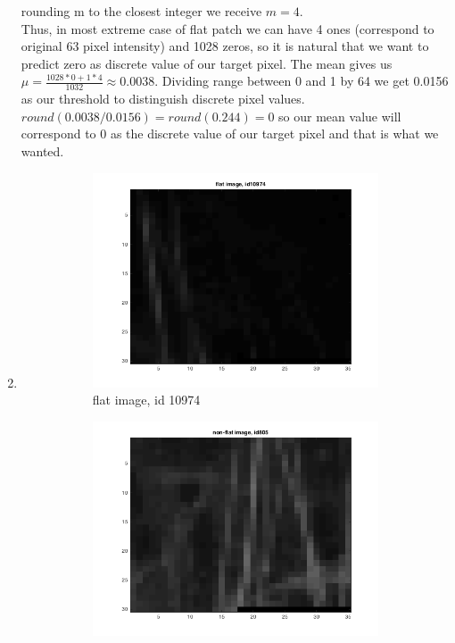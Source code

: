 \documentclass{article}
\begin{document}
\begin{enumerate}[label=(\alph*)]
					rounding m to the closest integer we receive $m = 4$. \\Thus, in most extreme case of flat patch we can have 4 ones (correspond to original 63 pixel intensity) and 1028 zeros, so it is natural that we want to predict zero as discrete value of our target pixel.  The mean gives us $\mu = \frac{1028 * 0 + 1 * 4} {1032} \approx 0.0038$. Dividing range between 0 and 1 by 64 we get 0.0156 as our threshold to distinguish discrete pixel values. $round(0.0038/0.0156)=round(0.244)=0$ so our mean value will correspond to 0 as the discrete value of our target pixel and that is what we wanted.
				\item
				 	\begin{figure}[t]
				 		\caption{patch images}
						\begin{subfigure}{0.5\textwidth}
											      	\includegraphics[width=\linewidth]{images/p1-1-c_flat}
											      	\caption{flat image, id 10974}
											      	\label{fig:flat_patch_image}
						\end{subfigure}%
						\begin{subfigure}{0.5\textwidth}
											      	\includegraphics[width=\linewidth]{images/p1-1-c_non_flat}

\end{subfigure}
\end{figure}
\end{enumerate}
\end{document}

